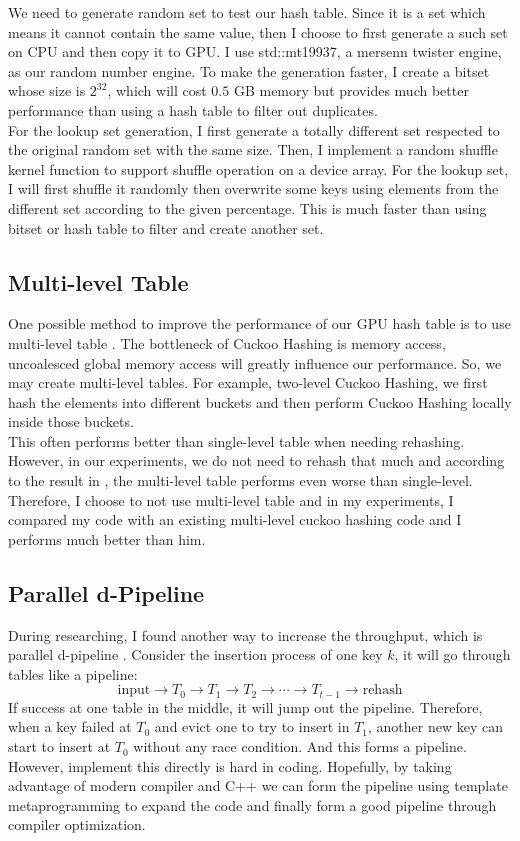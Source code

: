\documentclass[10pt,twocolumn,letterpaper]{article}
\begin{document}
We need to generate random set to test our hash table. Since it is a set which means it cannot contain the same value, then I choose to first generate a such set on CPU and then copy it to GPU. I use std::mt19937, a mersenn twister engine, as our random number engine. To make the generation faster, I create a bitset whose size is $2^{32}$, which will cost $0.5$ GB memory but provides much better performance than using a hash table to filter out duplicates. \\
For the lookup set generation, I first generate a totally different set respected to the original random set with the same size. Then, I implement a random shuffle kernel function to support shuffle operation on a device array. For the lookup set, I will first shuffle it randomly then overwrite some keys using elements from the different set according to the given percentage. This is much faster than using bitset or hash table to filter and create another set.

\subsection{Multi-level Table}

One possible method to improve the performance of our GPU hash table is to use multi-level table \cite{analysinghashtable}. The bottleneck of Cuckoo Hashing is memory access, uncoalesced global memory access will greatly influence our performance. So, we may create multi-level tables. For example, two-level Cuckoo Hashing, we first hash the elements into different buckets and then perform Cuckoo Hashing locally inside those buckets.\\
This often performs better than single-level table when needing rehashing. However, in our experiments, we do not need to rehash that much and according to the result in \cite{analysinghashtable}, the multi-level table performs even worse than single-level. Therefore, I choose to not use multi-level table and in my experiments, I compared my code with an existing multi-level cuckoo hashing code and I performs much better than him.

\subsection{Parallel d-Pipeline}

During researching, I found another way to increase the throughput, which is parallel d-pipeline \cite{7070722}. Consider the insertion process of one key $k$, it will go through tables like a pipeline:
$$\text{input} \rightarrow T_0 \rightarrow T_1 \rightarrow T_2 \rightarrow \cdots \rightarrow T_{t - 1} \rightarrow \text{rehash}$$
If success at one table in the middle, it will jump out the pipeline. Therefore, when a key failed at $T_0$ and evict one to try to insert in $T_1$, another new key can start to insert at $T_0$ without any race condition. And this forms a pipeline.\\
However, implement this directly is hard in coding. Hopefully, by taking advantage of modern compiler and C++ we can form the pipeline using template metaprogramming to expand the code and finally form a good pipeline through compiler optimization.
\end{document}
